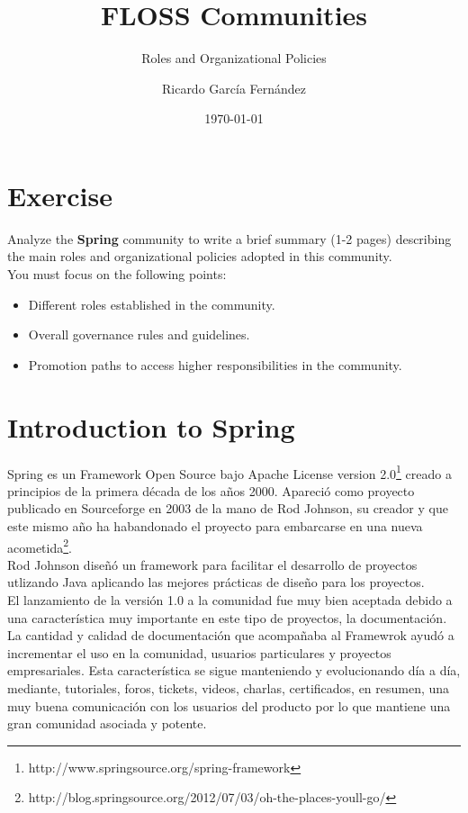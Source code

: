 \documentclass[11pt]{scrartcl}
\title{\textbf{FLOSS Communities}}
\subtitle{Roles and Organizational Policies}
\author{Ricardo Garc\'ia Fern\'andez}
\date{\today}
\begin{document}
\maketitle

\section{Exercise}

Analyze the \textbf{Spring} community to write a brief summary (1-2 pages) describing the main roles and organizational policies adopted in this community.\\

You must focus on the following points:

\begin{itemize}
    \item Different roles established in the community.
    \item Overall governance rules and guidelines.
    \item Promotion paths to access higher responsibilities in the community.
\end{itemize}

\section{Introduction to Spring}

Spring es un Framework Open Source bajo Apache License version 2.0\footnote{http://www.springsource.org/spring-framework} creado a principios de la primera d\'ecada de los a\~nos 2000. Apareci\'o como proyecto publicado en Sourceforge en 2003 de la mano de Rod Johnson, su creador y que este mismo a\~no ha habandonado el proyecto para embarcarse en una nueva acometida\footnote{http://blog.springsource.org/2012/07/03/oh-the-places-youll-go/}.\\

Rod Johnson dise\~n\'o un framework para facilitar el desarrollo de proyectos utlizando Java aplicando las mejores pr\'acticas de dise\~no para los proyectos.\\

El lanzamiento de la versi\'on 1.0 a la comunidad fue muy bien aceptada debido a una caracter\'istica muy importante en este tipo de proyectos, la documentaci\'on. La cantidad y calidad de documentaci\'on que acompa\~naba al Framewrok ayud\'o a incrementar el uso en la comunidad, usuarios particulares y proyectos empresariales.
Esta caracter\'istica se sigue manteniendo y evolucionando d\'ia a d\'ia, mediante, tutoriales, foros, tickets, videos, charlas, certificados, en resumen, una muy buena comunicaci\'on con los usuarios del producto por lo que mantiene una gran comunidad asociada y potente.
\end{document}
